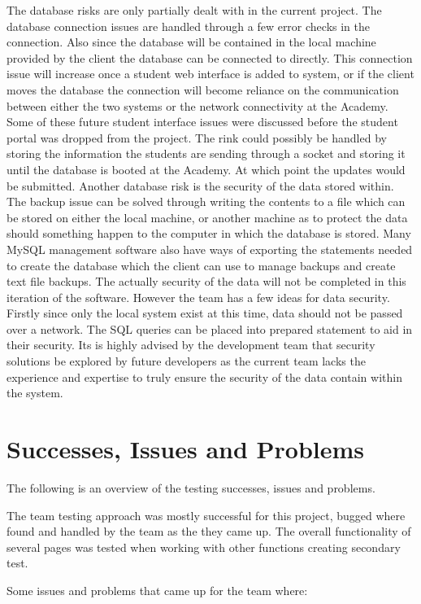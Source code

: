 The database risks are only partially dealt with in the current project. The database connection issues are handled through a few error checks in the connection. Also since the database will be contained in the local machine provided by the client the database can be connected to directly. This connection issue will increase once a student web interface is added to system, or if the client moves the database the connection will become reliance on the communication between either the two systems or the network connectivity at the Academy. Some of these future student interface issues were discussed before the student portal was dropped from the project. The rink could possibly be handled by storing the information the students are sending through a socket and storing it until the database is booted at the Academy. At which point the updates would be submitted.
Another database risk is the security of the data stored within. The backup issue can be solved through writing the contents to a file which can be stored on either the local machine, or another machine as to protect the data should something happen to the computer in which the database is stored. Many MySQL management software also have ways of exporting the statements needed to create the database which the client can use to manage backups and create text file backups. The actually security of the data will not be completed in this iteration of the software. However the team has a few ideas for data security. Firstly since only the local system exist at this time, data should not be passed over a network. The SQL queries can be placed into prepared statement to aid in their security. Its is highly advised by the development team that security solutions be explored by future developers as the current team lacks the experience and expertise to truly ensure the security of the data contain within the system.

\section{Successes, Issues and Problems}
The following is an overview of the testing successes, issues and problems.

The team testing approach was mostly successful for this project, bugged where found and handled by the team as the they came up. The overall functionality of several pages was tested when working with other functions creating secondary test.

Some issues and problems that came up for the team where:

